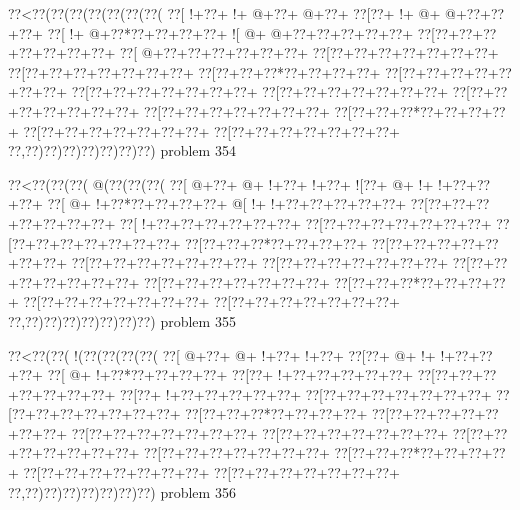 \vbox{\vbox{\goo
\0??<\0??(\0??(\0??(\0??(\0??(\0??(\0??(
\0??[\- !+\0??+\- !+\- @+\0??+\- @+\0??+
\0??[\0??+\- !+\- @+\- @+\0??+\0??+\0??+
\0??[\- !+\- @+\0??*\0??+\0??+\0??+\0??+
\- ![\- @+\- @+\0??+\0??+\0??+\0??+\0??+
\0??[\0??+\0??+\0??+\0??+\0??+\0??+\0??+
\0??[\- @+\0??+\0??+\0??+\0??+\0??+\0??+
\0??[\0??+\0??+\0??+\0??+\0??+\0??+\0??+
\0??[\0??+\0??+\0??+\0??+\0??+\0??+\0??+
\0??[\0??+\0??+\0??*\0??+\0??+\0??+\0??+
\0??[\0??+\0??+\0??+\0??+\0??+\0??+\0??+
\0??[\0??+\0??+\0??+\0??+\0??+\0??+\0??+
\0??[\0??+\0??+\0??+\0??+\0??+\0??+\0??+
\0??[\0??+\0??+\0??+\0??+\0??+\0??+\0??+
\0??[\0??+\0??+\0??+\0??+\0??+\0??+\0??+
\0??[\0??+\0??+\0??*\0??+\0??+\0??+\0??+
\0??[\0??+\0??+\0??+\0??+\0??+\0??+\0??+
\0??[\0??+\0??+\0??+\0??+\0??+\0??+\0??+
\0??,\0??)\0??)\0??)\0??)\0??)\0??)\0??)
}
\hfil problem 354\hfil\break
}

\vbox{\vbox{\goo
\0??<\0??(\0??(\0??(\- @(\0??(\0??(\0??(
\0??[\- @+\0??+\- @+\- !+\0??+\- !+\0??+
\- ![\0??+\- @+\- !+\- !+\0??+\0??+\0??+
\0??[\- @+\- !+\0??*\0??+\0??+\0??+\0??+
\- @[\- !+\- !+\0??+\0??+\0??+\0??+\0??+
\0??[\0??+\0??+\0??+\0??+\0??+\0??+\0??+
\0??[\- !+\0??+\0??+\0??+\0??+\0??+\0??+
\0??[\0??+\0??+\0??+\0??+\0??+\0??+\0??+
\0??[\0??+\0??+\0??+\0??+\0??+\0??+\0??+
\0??[\0??+\0??+\0??*\0??+\0??+\0??+\0??+
\0??[\0??+\0??+\0??+\0??+\0??+\0??+\0??+
\0??[\0??+\0??+\0??+\0??+\0??+\0??+\0??+
\0??[\0??+\0??+\0??+\0??+\0??+\0??+\0??+
\0??[\0??+\0??+\0??+\0??+\0??+\0??+\0??+
\0??[\0??+\0??+\0??+\0??+\0??+\0??+\0??+
\0??[\0??+\0??+\0??*\0??+\0??+\0??+\0??+
\0??[\0??+\0??+\0??+\0??+\0??+\0??+\0??+
\0??[\0??+\0??+\0??+\0??+\0??+\0??+\0??+
\0??,\0??)\0??)\0??)\0??)\0??)\0??)\0??)
}
\hfil problem 355\hfil\break
}

\vbox{\vbox{\goo
\0??<\0??(\0??(\- !(\0??(\0??(\0??(\0??(
\0??[\- @+\0??+\- @+\- !+\0??+\- !+\0??+
\0??[\0??+\- @+\- !+\- !+\0??+\0??+\0??+
\0??[\- @+\- !+\0??*\0??+\0??+\0??+\0??+
\0??[\0??+\- !+\0??+\0??+\0??+\0??+\0??+
\0??[\0??+\0??+\0??+\0??+\0??+\0??+\0??+
\0??[\0??+\- !+\0??+\0??+\0??+\0??+\0??+
\0??[\0??+\0??+\0??+\0??+\0??+\0??+\0??+
\0??[\0??+\0??+\0??+\0??+\0??+\0??+\0??+
\0??[\0??+\0??+\0??*\0??+\0??+\0??+\0??+
\0??[\0??+\0??+\0??+\0??+\0??+\0??+\0??+
\0??[\0??+\0??+\0??+\0??+\0??+\0??+\0??+
\0??[\0??+\0??+\0??+\0??+\0??+\0??+\0??+
\0??[\0??+\0??+\0??+\0??+\0??+\0??+\0??+
\0??[\0??+\0??+\0??+\0??+\0??+\0??+\0??+
\0??[\0??+\0??+\0??*\0??+\0??+\0??+\0??+
\0??[\0??+\0??+\0??+\0??+\0??+\0??+\0??+
\0??[\0??+\0??+\0??+\0??+\0??+\0??+\0??+
\0??,\0??)\0??)\0??)\0??)\0??)\0??)\0??)
}
\hfil problem 356\hfil\break
}

